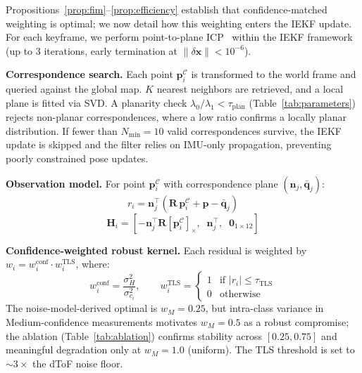 \documentclass[journal]{IEEEtran}
\begin{document}
Propositions~\ref{prop:fim}--\ref{prop:efficiency} establish that confidence-matched weighting is optimal; we now detail how this weighting enters the IEKF update. For each keyframe, we perform point-to-plane ICP~\cite{pomerleau2015review} within the IEKF framework (up to 3 iterations, early termination at $\|\delta\mathbf{x}\| < 10^{-6}$).

\textbf{Correspondence search.} Each point $\mathbf{p}_i^{\mathcal{C}}$ is transformed to the world frame and queried against the global map. $K$ nearest neighbors are retrieved, and a local plane is fitted via SVD. A planarity check $\lambda_0 / \lambda_1 < \tau_{\text{plan}}$ (Table~\ref{tab:parameters}) rejects non-planar correspondences, where a low ratio confirms a locally planar distribution. If fewer than $N_{\min} = 10$ valid correspondences survive, the IEKF update is skipped and the filter relies on IMU-only propagation, preventing poorly constrained pose updates.

\textbf{Observation model.} For point $\mathbf{p}_i^{\mathcal{C}}$ with correspondence plane $(\mathbf{n}_j, \bar{\mathbf{q}}_j)$:
\begin{equation}
    r_i = \mathbf{n}_j^\top \left( \mathbf{R}\,\mathbf{p}_i^{\mathcal{C}} + \mathbf{p} - \bar{\mathbf{q}}_j \right)
    \label{eq:residual}
\end{equation}
\begin{equation}
    \mathbf{H}_i = \left[ -\mathbf{n}_j^\top \mathbf{R} [\mathbf{p}_i^{\mathcal{C}}]_\times,\;\; \mathbf{n}_j^\top,\;\; \mathbf{0}_{1 \times 12} \right]
    \label{eq:jacobian}
\end{equation}

\textbf{Confidence-weighted robust kernel.} Each residual is weighted by $w_i = w_i^{\text{conf}} \cdot w_i^{\text{TLS}}$, where:
\begin{equation}
    w_i^{\text{conf}} = \frac{\sigma_H^2}{\sigma_{c_i}^2}, \qquad
    w_i^{\text{TLS}} = \begin{cases}
        1 & \text{if } |r_i| \leq \tau_{\text{TLS}} \\
        0 & \text{otherwise}
    \end{cases}
    \label{eq:weight}
\end{equation}
The noise-model-derived optimal is $w_M = 0.25$, but intra-class variance in Medium-confidence measurements motivates $w_M = 0.5$ as a robust compromise; the ablation (Table~\ref{tab:ablation}) confirms stability across $[0.25, 0.75]$ and meaningful degradation only at $w_M = 1.0$ (uniform). The TLS threshold is set to ${\sim}3\times$ the dToF noise floor.
\end{document}
